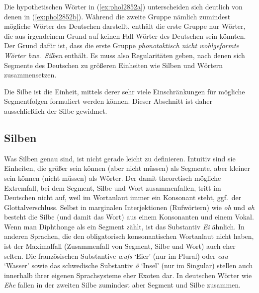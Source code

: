 Die hypothetischen Wörter in (\ref{ex:phol2852a}) unterscheiden sich deutlich von denen in (\ref{ex:phol2852b}).
Während die zweite Gruppe nämlich zumindest mögliche Wörter des Deutschen darstellt, enthält die erste Gruppe nur Wörter, die aus irgendeinem Grund auf keinen Fall Wörter des Deutschen sein könnten.
Der Grund dafür ist, dass die erste Gruppe \textit{phonotaktisch nicht wohlgeformte Wörter bzw.\ Silben} enthält.
Es muss also Regularitäten geben, nach denen sich Segmente des Deutschen zu größeren Einheiten wie Silben und Wörtern zusammensetzen.


Die Silbe ist die Einheit, mittels derer sehr viele Einschränkungen für mögliche Segmentfolgen formuliert werden können.
Dieser Abschnitt ist daher ausschließlich der Silbe gewidmet.

\subsection{Silben}

\label{sec:silben}


Was Silben genau sind, ist nicht gerade leicht zu definieren.
Intuitiv sind sie Einheiten, die größer sein können (aber nicht müssen) als Segmente, aber kleiner sein können (nicht müssen) als Wörter.
Der damit theoretisch mögliche Extremfall, bei dem Segment, Silbe und Wort zusammenfallen, tritt im Deutschen nicht auf, weil im Wortanlaut immer ein Konsonant steht, ggf.\ der Glottalverschluss.
Selbst in marginalen Interjektionen (Rufwörtern) wie \textit{oh} \textipa{[Po:]} und \textit{ah} \textipa{[Pa:]} besteht die Silbe (und damit das Wort) aus einem Konsonanten und einem Vokal.
Wenn man Diphthonge als ein Segment zählt, ist das Substantiv \textit{Ei} \textipa{[P\t{aE}]} ähnlich.
In anderen Sprachen, die den obligatorisch konsonantischen Wortanlaut nicht haben, ist der Maximalfall (Zusammenfall von Segment, Silbe und Wort) auch eher selten.
Die französischen Substantive \textit{œufs} \textipa{[\o:]} `Eier' (nur im Plural) oder \textit{eau} \textipa{[o:]} `Wasser' sowie das schwedische Substantiv \textit{ö} \textipa{[\oe:]} `Insel' (nur im Singular) stellen auch innerhalb ihrer eigenen Sprachsysteme eher Exoten dar.
In deutschen Wörter wie \textit{Ehe} \textipa{[Pe:@]} fallen in der zweiten Silbe zumindest aber Segment und Silbe \textipa{[@]} zusammen.

